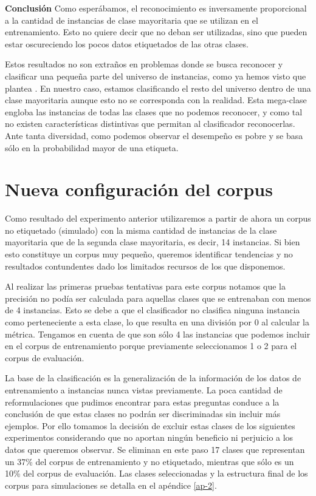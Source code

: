 \vspace{3 mm}

\textbf{Conclusión}
Como esperábamos, el reconocimiento es inversamente proporcional a la cantidad de instancias de clase mayoritaria que se utilizan en el entrenamiento. Esto no quiere decir que no deban ser utilizadas, sino que pueden estar oscureciendo los pocos datos etiquetados de las otras clases.

Estos resultados no son extraños en problemas donde se busca reconocer y clasificar una pequeña parte del universo de instancias, como ya hemos visto que plantea \citet{rare-classes-holpedales}. En nuestro caso, estamos clasificando el resto del universo dentro de una clase mayoritaria aunque esto no se corresponda con la realidad. Esta mega-clase engloba las instancias de todas las clases que no podemos reconocer, y como tal no existen características distintivas que permitan al clasificador reconocerlas. Ante tanta diversidad, como podemos observar el desempeño es pobre y se basa sólo en la probabilidad mayor de una etiqueta.


\section{Nueva configuración del corpus}

Como resultado del experimento anterior utilizaremos a partir de ahora un corpus no etiquetado (simulado) con la misma cantidad de instancias de la clase mayoritaria que de la segunda clase mayoritaria, es decir, 14 instancias. Si bien esto constituye un corpus muy pequeño, queremos identificar tendencias y no resultados contundentes dado los limitados recursos de los que disponemos.

Al realizar las primeras pruebas tentativas para este corpus notamos que la precisión no podía ser calculada para aquellas clases que se entrenaban con menos de 4 instancias. Esto se debe a que el clasificador no clasifica ninguna instancia como perteneciente a esta clase, lo que resulta en una división por 0 al calcular la métrica. Tengamos en cuenta de que son sólo 4 las instancias que podemos incluir en el corpus de entrenamiento porque previamente seleccionamos 1 o 2 para el corpus de evaluación.

La base de la clasificación es la generalización de la información de los datos de entrenamiento a instancias nunca vistas previamente. La poca cantidad de reformulaciones que pudimos encontrar para estas preguntas conduce a la conclusión de que estas clases no podrán ser discriminadas sin incluir más ejemplos. Por ello tomamos la decisión de excluir estas clases de los siguientes experimentos considerando que no aportan ningún beneficio ni perjuicio a los datos que queremos observar. Se eliminan en este paso 17 clases que representan un 37\% del corpus de entrenamiento y no etiquetado, mientras que sólo es un 10\% del corpus de evaluación. Las clases seleccionadas y la estructura final de los corpus para simulaciones se detalla en el apéndice \ref{ap-2}.


